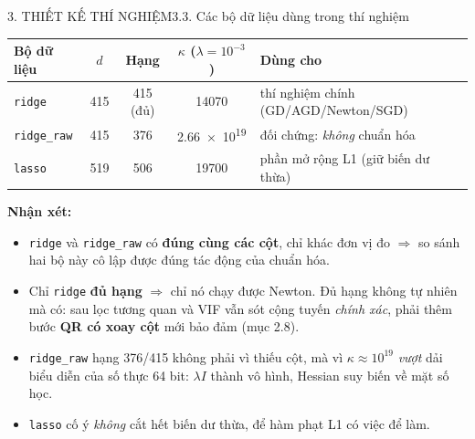 \documentclass[aspectratio=169,11pt]{beamer}
\newcommand{\nx}{\textbf{Nhận xét:}}
\begin{document}
\begin{frame}{3. THIẾT KẾ THÍ NGHIỆM}{3.3. Các bộ dữ liệu dùng trong thí nghiệm}
  \small
  \begin{center}
  \begin{tabular}{lcccl}
    \toprule
    Bộ dữ liệu & $d$ & Hạng & $\kappa$ ($\lambda{=}10^{-3}$) & Dùng cho\\
    \midrule
    \texttt{ridge}      & 415 & 415 (đủ)  & \num{14070}   & thí nghiệm chính (GD/AGD/Newton/SGD)\\
    \texttt{ridge\_raw} & 415 & 376       & \num{2.66e19} & đối chứng: \emph{không} chuẩn hóa\\
    \texttt{lasso}      & 519 & 506       & \num{19700}   & phần mở rộng L1 (giữ biến dư thừa)\\
    \bottomrule
  \end{tabular}
  \end{center}
  \vspace{4pt}
  {\footnotesize\nx{}}
  \begin{itemize}\footnotesize
    \item \texttt{ridge} và \texttt{ridge\_raw} có \textbf{đúng cùng các cột}, chỉ khác đơn vị đo
          $\Rightarrow$ so sánh hai bộ này cô lập được đúng tác động của chuẩn hóa.
    \item Chỉ \texttt{ridge} \textbf{đủ hạng} $\Rightarrow$ chỉ nó chạy được Newton. Đủ hạng không
          tự nhiên mà có: sau lọc tương quan và VIF vẫn sót cộng tuyến \emph{chính xác}, phải thêm
          bước \textbf{QR có xoay cột} mới bảo đảm (mục 2.8).
    \item \texttt{ridge\_raw} hạng 376/415 không phải vì thiếu cột, mà vì $\kappa\approx10^{19}$
          \emph{vượt} dải biểu diễn của số thực 64 bit: $\lambda I$ thành vô hình, Hessian suy biến
          về mặt số học.
    \item \texttt{lasso} cố ý \emph{không} cắt hết biến dư thừa, để hàm phạt L1 có việc để làm.
  \end{itemize}
\end{frame}
\end{document}
